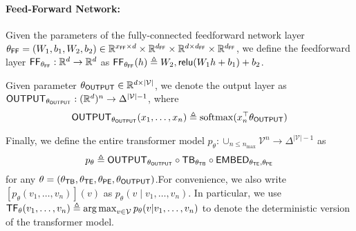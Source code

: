 \paragraph{Feed-Forward Network:} Given the parameters of the fully-connected feedforward network layer $\theta_{\mathsf{FF}} = (W_1, b_1, W_2, b_2) \in \mathbb{R}^{x_{\mathsf{FF}} \times d} \times \mathbb{R}^{d_{\mathsf{FF}}} \times \mathbb{R}^{d \times d_{\mathsf{FF}}} \times \mathbb{R}^{d_{\mathsf{FF}}}$, we define the feedforward layer $\mathsf{FF}_{\theta_{\mathsf{FF}}}: \mathbb{R}^{d} \to \mathbb{R}^{d}$ as $\mathsf{FF}_{\theta_{\mathsf{FF}}}(h) \triangleq W_2, \mathsf{relu}(W_1 h + b_1) + b_2$.

\iffalse
\begin{definition}[Transformer Block]\label{defi:transformer_block}
Given number of layers $L\in\mathbb{N}^+$ and parameter $\theta_\tfblock = (\theta^{(l)}_\mha,\theta^{(l)}_\ff )_{l=0}^{L-1}$, we define the $L$-layer transformer block $\tfblock_{\theta_\tfblock}:(\mathbb{R}^d)^n\to (\mathbb{R}^d)^n$ for any $n\in\mathbb{N}^+$ as \begin{equation}
    \tfblock_{\theta_\tfblock} \triangleq (\id+ \ff_{\theta^{(L-1)}_\ff})\circ (\id+ \mha_{\theta^{(L-1)}_\mha})\circ \cdots (\id+ \ff_{\theta^{(0)}_\ff})\circ (\id+ \mha_{\theta^{(0)}_\mha})
\end{equation}
\end{definition}
\fi

\begin{definition}\label{defi:output_layer}
    Given parameter $\theta_{\mathsf{OUTPUT}} \in\mathbb{R}^{d\times |\mathcal{V}|}$, we denote the output layer as $\mathsf{OUTPUT}_{\theta_{\mathsf{OUTPUT}}}:(\mathbb{R}^d)^n\to \Delta^{|\mathcal{V}|-1}$, where 
    \begin{align}
        \mathsf{OUTPUT}_{\theta_{\mathsf{OUTPUT}}}(x_1,\ldots,x_n) \triangleq \mathrm{softmax}(x_n^\top \theta_{\mathsf{OUTPUT}})
    \end{align}
\end{definition}

Finally, we define the entire transformer model $p_{\theta}: \cup_{n\le n_{\max}} \mathcal{V}^n\to \Delta^{|\mathcal{V}|-1}$ as 
\begin{align}
p_{\theta}\triangleq \mathsf{OUTPUT}_{\theta_{\mathsf{OUTPUT}}}\circ \mathsf{TB}_{\theta_{\mathsf{TB}}}\circ \mathsf{EMBED}_{\theta_{\mathsf{TE}},\theta_{\mathsf{PE}}}
\end{align}
for any $\theta = (\theta_{\mathsf{TB}},\theta_{\mathsf{TE}},\theta_{\mathsf{PE}},\theta_{\mathsf{OUTPUT}})$.For convenience, we also write $\left[p_{\theta}(v_1,\ldots,v_n)\right](v)$ as $p_{\theta}(v\mid v_1,\ldots,v_n)$.
In particular, we use $\mathsf{TF}_{\theta}(v_1,\ldots,v_n) \triangleq \operatorname*{arg\,max}_{v\in\mathcal{V}} p_{\theta}(v|v_1,\ldots,v_n)$ to denote the deterministic version of the transformer model. 

